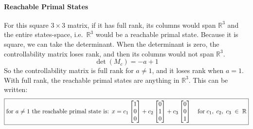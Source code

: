 \paragraph{Reachable Primal States} For this square $3\times3$ matrix, if it has full rank, its columns would span $\mathbb{R}^{3}$ and the entire states-space, i.e.\ $\mathbb{R}^{3}$ would be a reachable primal state.
Because it is square, we can take the determinant.
When the determinant is zero, the controllability matrix loses rank, and then its columns would not span $\mathbb{R}^{3}$.
\begin{equation*}
  \det(M_{c})=-a+1
\end{equation*}
So the controllability matrix is full rank for $a\neq1$, and it loses rank when $a=1$.
With full rank, the reachable primal states are anything in $\mathbb{R}^{3}$.
This can be written:
\begin{equation*}
  \boxed{%
    \text{for $a\neq1$ the reachable primal state is: }x=c_{1}
    \begin{bmatrix}
      1 \\
      0 \\
      0
    \end{bmatrix}+c_{2}
    \begin{bmatrix}
      0 \\
      1 \\
      0
    \end{bmatrix}+c_{3}
    \begin{bmatrix}
      0 \\
      0 \\
      1
    \end{bmatrix}
    \quad \text{for}\;c_{1},\;c_{2},\;c_{3}\;\in\;\mathbb{R}
  }
\end{equation*}


